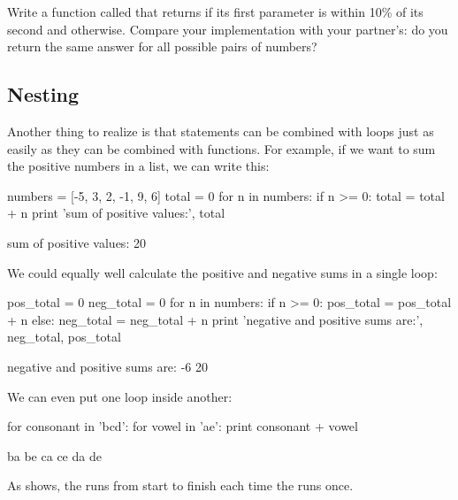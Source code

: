 \begin{challenge}
  Write a function called  that returns  if
  its first parameter is within 10\% of its second and 
  otherwise. Compare your implementation with your partner's: do you
  return the same answer for all possible pairs of numbers?
\end{challenge}

\subsection{Nesting}

Another thing to realize is that  statements can be combined
with loops just as easily as they can be combined with functions. For
example, if we want to sum the positive numbers in a list, we can write
this:

\begin{VerbIn}
numbers = [-5, 3, 2, -1, 9, 6]
total = 0
for n in numbers:
    if n >= 0:
        total = total + n
print 'sum of positive values:', total
\end{VerbIn}

\begin{VerbOut}
sum of positive values: 20
\end{VerbOut}

We could equally well calculate the positive and negative sums in a
single loop:

\begin{VerbIn}
pos_total = 0
neg_total = 0
for n in numbers:
    if n >= 0:
        pos_total = pos_total + n
    else:
        neg_total = neg_total + n
print 'negative and positive sums are:', neg_total, pos_total
\end{VerbIn}

\begin{VerbOut}
negative and positive sums are: -6 20
\end{VerbOut}

We can even put one loop inside another:

\begin{VerbIn}
for consonant in 'bcd':
    for vowel in 'ae':
        print consonant + vowel
\end{VerbIn}

\begin{VerbOut}
ba
be
ca
ce
da
de
\end{VerbOut}

As  shows, the  runs
from start to finish each time the 
runs once.

